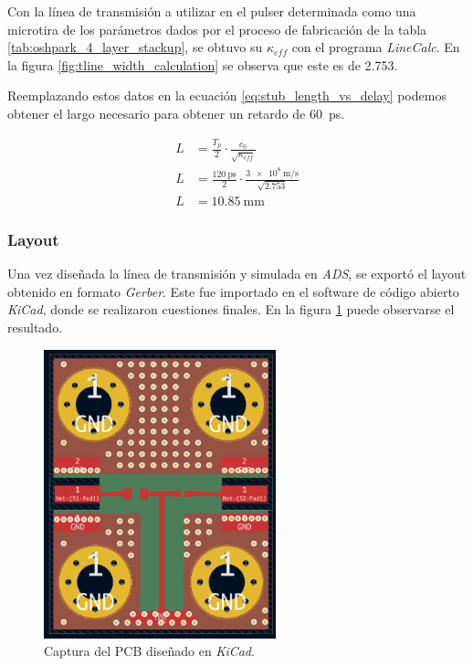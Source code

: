 Con la línea de transmisión a utilizar en el pulser determinada como una
microtira de los parámetros dados por el proceso de fabricación de la tabla
\ref{tab:oshpark_4_layer_stackup}, se obtuvo su $\kappa_{eff}$ con el programa
\textit{LineCalc}. En la figura \ref{fig:tline_width_calculation} se observa que
este es de \num{2.753}.

Reemplazando estos datos en la ecuación \ref{eq:stub_length_vs_delay} podemos
obtener el largo necesario para obtener un retardo de \qty{60}{\pico\second}.

\begin{equation}
    \begin{aligned}
        L &= \frac{T_p}{2} \cdot \frac{c_0}{\sqrt{\kappa_{eff}}} \\
        L &= \frac{\qty{120}{\pico\second}}{2} \cdot \frac{
            \qty{3e8}{\meter\per\second}}{\sqrt{2.753}} \\
        L &= \qty{10.85}{\milli\meter}
    \end{aligned}
\end{equation}

\subsubsection{Layout}

Una vez diseñada la línea de transmisión y simulada en \textit{ADS}, se exportó
el layout obtenido en formato \textit{Gerber}. Este fue importado en el software
de código abierto \textit{KiCad}, donde se realizaron cuestiones finales. En la
figura \ref{fig:pulser_layout} puede observarse el resultado.

\begin{figure}[tbp]
    \centering
    \includegraphics[width=0.6\textwidth]{images/pulser_layout.png}
    \caption{Captura del PCB diseñado en \textit{KiCad}.}
    \label{fig:pulser_layout}
\end{figure}

